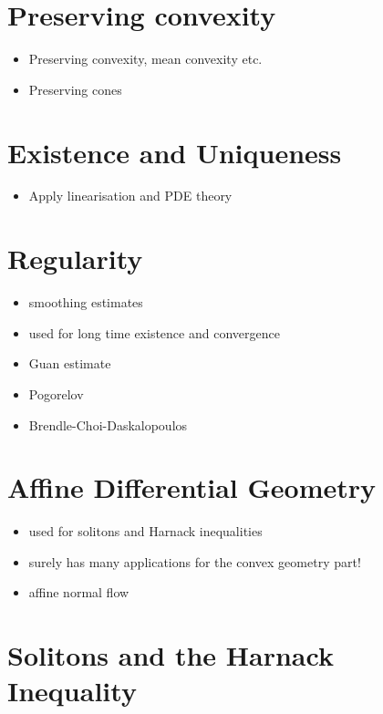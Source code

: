 \chapter{Preserving convexity}

\begin{itemize}
\item Preserving convexity, mean convexity etc.
\item Preserving cones
\end{itemize}

\chapter{Existence and Uniqueness}

\begin{itemize}
\item Apply linearisation and PDE theory
\end{itemize}

\chapter{Regularity}

\begin{itemize}
\item smoothing estimates
\item used for long time existence and convergence
\item Guan estimate
\item Pogorelov
\item Brendle-Choi-Daskalopoulos
\end{itemize}

\chapter{Affine Differential Geometry}

\begin{itemize}
\item used for solitons and Harnack inequalities
\item surely has many applications for the convex geometry part!
\item affine normal flow
\end{itemize}

\chapter{Solitons and the Harnack Inequality}

